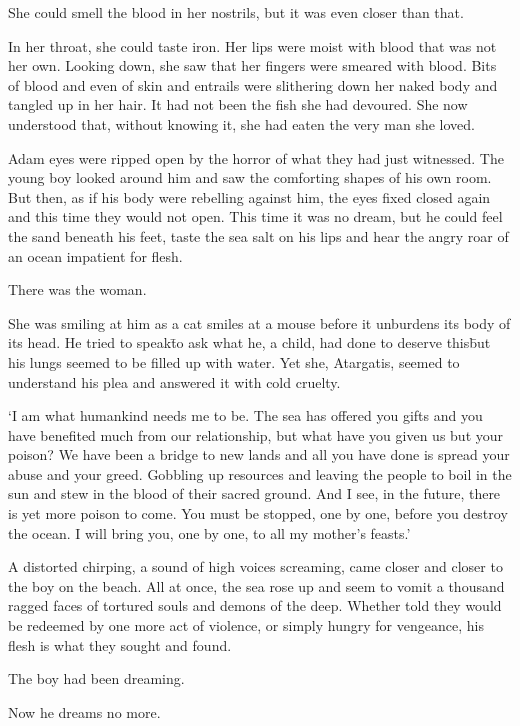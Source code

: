 She could smell the blood in her nostrils, but it was even closer than
that.

In her throat, she could taste iron. Her lips were moist with blood
that was not her own. Looking down, she saw that her fingers were
smeared with blood. Bits of blood and even of skin and entrails were
slithering down her naked body and tangled up in her hair. It had not
been the fish she had devoured. She now understood that, without
knowing it, she had eaten the very man she loved.

Adam eyes were ripped open by the horror of what they had just
witnessed. The young boy looked around him and saw the comforting
shapes of his own room. But then, as if his body were rebelling
against him, the eyes fixed closed again and this time they would not
open. This time it was no dream, but he could feel the sand beneath
his feet, taste the sea salt on his lips and hear the angry roar of an
ocean impatient for flesh.

There was the woman.

She was smiling at him as a cat smiles at a mouse before it unburdens
its body of its head.  He tried to speak\=to ask what he, a child, had
done to deserve this\=but his lungs seemed to be filled up with
water. Yet she, Atargatis, seemed to understand his plea and answered
it with cold cruelty.

`I am what humankind needs me to be. The sea has offered you gifts and
you have benefited much from our relationship, but what have you given
us but your poison? We have been a bridge to new lands and all you
have done is spread your abuse and your greed. Gobbling up resources
and leaving the people to boil in the sun and stew in the blood of
their sacred ground. And I see, in the future, there is yet more
poison to come. You must be stopped, one by one, before you destroy
the ocean. I will bring you, one by one, to all my mother’s feasts.'

A distorted chirping, a sound of high voices screaming, came
closer and closer to the boy on the beach. All at once, the sea rose
up and seem to vomit a thousand ragged faces of tortured souls and
demons of the deep. Whether told they would be redeemed by one more
act of violence, or simply hungry for vengeance, his flesh is what
they sought and found.

The boy had
been dreaming.

Now he dreams no more.
